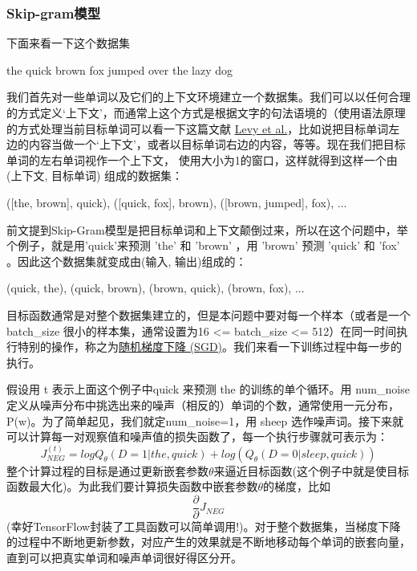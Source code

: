 \subsubsection{Skip-gram模型}
下面来看一下这个数据集

the quick brown fox jumped over the lazy dog

我们首先对一些单词以及它们的上下文环境建立一个数据集。我们可以以任何合理的方式定义‘上下文’，而通常上这个方式是根据文字的句法语境的（使用语法原理的方式处理当前目标单词可以看一下这篇文献 \href{https://levyomer.files.wordpress.com/2014/04/dependency-based-word-embeddings-acl-2014.pdf}{Levy et al.}，比如说把目标单词左边的内容当做一个‘上下文’，或者以目标单词右边的内容，等等。现在我们把目标单词的左右单词视作一个上下文， 使用大小为1的窗口，这样就得到这样一个由(上下文, 目标单词) 组成的数据集：

([the, brown], quick), ([quick, fox], brown), ([brown, jumped], fox), ...

前文提到Skip-Gram模型是把目标单词和上下文颠倒过来，所以在这个问题中，举个例子，就是用'quick'来预测 'the' 和 'brown' ，用 'brown' 预测 'quick' 和 'fox' 。因此这个数据集就变成由(输入, 输出)组成的：

(quick, the), (quick, brown), (brown, quick), (brown, fox), ...

目标函数通常是对整个数据集建立的，但是本问题中要对每一个样本（或者是一个batch\_size 很小的样本集，通常设置为16 <= batch\_size <= 512）在同一时间执行特别的操作，称之为\href{https://en.wikipedia.org/wiki/Stochastic_gradient_descent}{随机梯度下降 (SGD)}。我们来看一下训练过程中每一步的执行。

假设用 t 表示上面这个例子中quick 来预测 the 的训练的单个循环。用 num\_noise 定义从噪声分布中挑选出来的噪声（相反的）单词的个数，通常使用一元分布，P(w)。为了简单起见，我们就定num\_noise=1，用 sheep 选作噪声词。接下来就可以计算每一对观察值和噪声值的损失函数了，每一个执行步骤就可表示为：
\begin{equation*}
J_{NEG}^{(t)}=logQ_{\theta}(D=1|the,quick)+log(Q_{\theta}(D=0|sleep,quick))
\end{equation*}
整个计算过程的目标是通过更新嵌套参数$\theta$来逼近目标函数(这个例子中就是使目标函数最大化)。为此我们要计算损失函数中嵌套参数$\theta$的梯度，比如\[\frac{\partial}{\partial}J_{NEG}\]
(幸好TensorFlow封装了工具函数可以简单调用!)。对于整个数据集，当梯度下降的过程中不断地更新参数，对应产生的效果就是不断地移动每个单词的嵌套向量，直到可以把真实单词和噪声单词很好得区分开。

